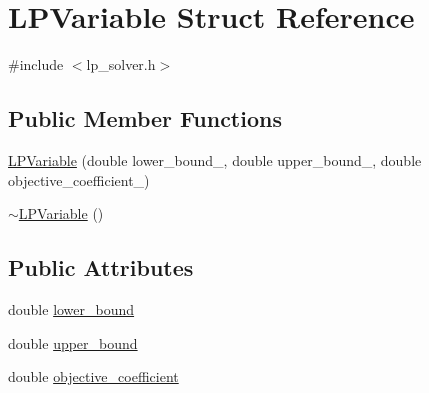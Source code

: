 \hypertarget{structLPVariable}{\section{L\-P\-Variable Struct Reference}
\label{structLPVariable}
}


{\ttfamily \#include $<$lp\-\_\-solver.\-h$>$}

\subsection*{Public Member Functions}
\begin{DoxyCompactItemize}
\item 
\hyperlink{structLPVariable_a2435a354991514695d8489cbb10566a4}{L\-P\-Variable} (double lower\-\_\-bound\-\_\-, double upper\-\_\-bound\-\_\-, double objective\-\_\-coefficient\-\_\-)
\item 
\hyperlink{structLPVariable_a0ca9ca3462358de851881b4e02fd2a3e}{$\sim$\-L\-P\-Variable} ()
\end{DoxyCompactItemize}
\subsection*{Public Attributes}
\begin{DoxyCompactItemize}
\item 
double \hyperlink{structLPVariable_ad585cb11eed3d2e2623c02c670defaaa}{lower\-\_\-bound}
\item 
double \hyperlink{structLPVariable_ab4b0c61c0cdc96074a321ae1a208dfc8}{upper\-\_\-bound}
\item 
double \hyperlink{structLPVariable_a3976a252d9778f6a1f9fceed83818f73}{objective\-\_\-coefficient}
\end{DoxyCompactItemize}


